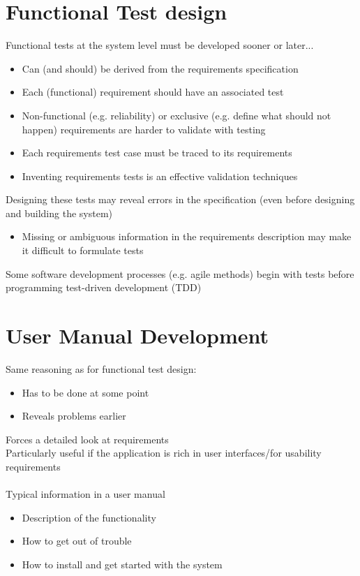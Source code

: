 \documentclass{article}[18pt]
\begin{document}
\section{Functional Test design}
Functional tests at the system level must be developed sooner or later...
\begin{itemize}
	\item Can (and should) be derived from the requirements specification
	\item Each (functional) requirement should have an associated test
	\item Non-functional (e.g. reliability) or exclusive (e.g. define what should not happen) requirements are harder to validate with testing
	\item Each requirements test case must be traced to its requirements
	\item Inventing requirements tests is an effective validation techniques
\end{itemize}
Designing these tests may reveal errors in the specification (even before designing and building the system)
\begin{itemize}
	\item Missing or ambiguous information in the requirements description may make it difficult to formulate tests
\end{itemize}
Some software development processes (e.g. agile methods) begin with tests before programming test-driven development (TDD)
\section{User Manual Development}
Same reasoning as for functional test design:
\begin{itemize}
	\item Has to be done at some point
	\item Reveals problems earlier
\end{itemize}
Forces a detailed look at requirements\\
Particularly useful if the application is rich in user interfaces/for usability requirements\\
\\
Typical information in a user manual
\begin{itemize}
	\item Description of the functionality
	\item How to get out of trouble
	\item How to install and get started with the system
\end{itemize}
\end{document}
